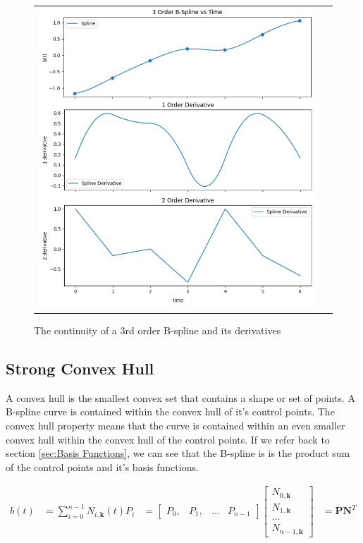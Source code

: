 \documentclass{article}
\begin{document}
\begin{figure}[H]
\begin{tabular}{ll}
\includegraphics[scale=.55]{Continuity.png}
\end{tabular}
\caption{The continuity of a 3rd order B-spline and its derivatives}
\label{Fig:Continuity}
\end{figure}
    
    \subsection{Strong Convex Hull}
    A convex hull is the smallest convex set that contains a shape or set of points. A B-spline curve is contained within the convex hull of it's control points. The  convex hull property means that the curve is contained within an even smaller convex hull within the convex hull of the control points. If we refer back to section \ref{sec:Basis Functions}, we can see that the B-spline is is the product sum of the control points and it's basis functions. 
    
    \begin{equation}
    \begin{aligned}
      b(t) &= \sum^{n-1}_{i=0} N_{i,\textbf{k}}(t) P_i
      &= \begin{bmatrix} P_0, & P_1, & ... & P_{n-1}\end{bmatrix} \begin{bmatrix} N_{0,\textbf{k}} \\ N_{1,\textbf{k}} \\ ... \\ N_{n-1,\textbf{k}} \end{bmatrix}
      &= \textbf{P} \textbf{N}^{T}
    \end{aligned}
    \end{equation}
    
\end{document}
